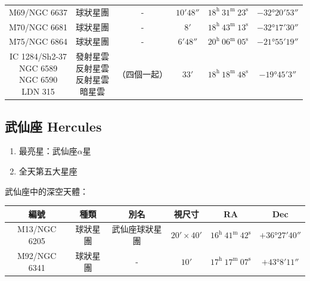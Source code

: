 \begin{center}
\begin{longtable}{c | c | c | c | c | c}
    M69/NGC 6637 & 球狀星團 & - & \(\ang{;10;48}\) & \(18^\text{h }31^\text{m }23^\text{s}\) & \(-\ang{32;20;53}\) \\ %
    M70/NGC 6681 & 球狀星團 & - & \(\ang{;8;}\) & \(18^\text{h }43^\text{m }13^\text{s}\) & \(-\ang{32;17;30}\) \\ %
    M75/NGC 6864 & 球狀星團 & - & \(\ang{;6;48}\) & \(20^\text{h }06^\text{m }05^\text{s}\) & \(-\ang{21;55;19}\) \\ %
    \makecell{IC 1284/Sh2-37 \\ NGC 6589 \\ NGC 6590 \\ LDN 315} & \makecell{發射星雲 \\ 反射星雲 \\ 反射星雲 \\ 暗星雲} & （四個一起） & \(\ang{;33;}\) & \(18^\text{h }18^\text{m }48^\text{s}\) & \(-\ang{19;45;3}\) \\ %
\end{longtable}
\end{center}

\subsection{武仙座 Hercules}
\begin{enumerate}
    \item 最亮星：武仙座\(\alpha\)星
    \item 全天第五大星座
\end{enumerate}
武仙座中的深空天體：
\newline

\begin{center}
\begin{longtable}{c | c | c | c | c | c}
    編號 & 種類 & 別名 & 視尺寸 & RA & Dec \\
    \hline
    \endfirsthead


    \endfoot

    \endlastfoot

    M13/NGC 6205 & 球狀星團 & 武仙座球狀星團 & \(\ang{;20;} \times \ang{;40;}\) & \(16^\text{h }41^\text{m }42^\text{s}\) & \(+\ang{36;27;40}\) \\ %
    M92/NGC 6341 & 球狀星團 & - & \(\ang{;10;}\) & \(17^\text{h }17^\text{m }07^\text{s}\) & \(+\ang{43;8;11}\) \\ %
\end{longtable}
\end{center}

